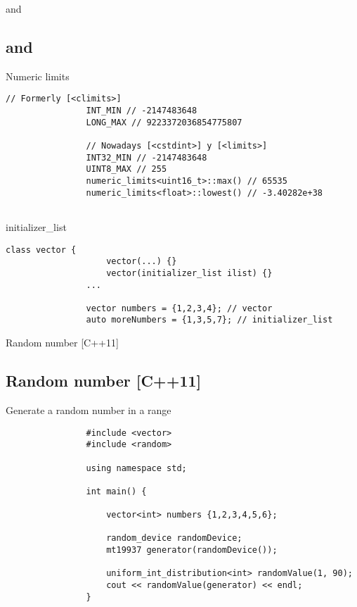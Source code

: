 \documentclass{beamer}
\newcommand{\normalSizeItem}[1] {
  \normalsize{\item #1}
}
\begin{document}
		\begin{frame}[fragile]{ and }	
			\subsection{ and }		
			\begin{itemize}
			
				\normalSizeItem { Numeric limits }
				\begin{lstlisting}[basicstyle={\tiny\ttfamily}]
				// Formerly [<climits>]
				INT_MIN // -2147483648
				LONG_MAX // 9223372036854775807
				
				// Nowadays [<cstdint>] y [<limits>]
				INT32_MIN // -2147483648
				UINT8_MAX // 255
				numeric_limits<uint16_t>::max() // 65535
				numeric_limits<float>::lowest() // -3.40282e+38
				
				\end{lstlisting}
				
				\normalSizeItem { initializer\_list }
				\begin{lstlisting}[basicstyle={\tiny\ttfamily}]
				class vector {
					vector(...) {}
					vector(initializer_list ilist) {}
				...
				
				vector numbers = {1,2,3,4}; // vector
				auto moreNumbers = {1,3,5,7}; // initializer_list
				\end{lstlisting}
				
			\end{itemize}
		\end{frame}
		
		\begin{frame}[fragile]{Random number [C++11]}	
			\subsection{Random number [C++11]}
			\begin{itemize}
			
				\normalSizeItem { Generate a random number in a range }
				\begin{lstlisting}
				#include <vector>
				#include <random>
				
				using namespace std;
				
				int main() {	
					
					vector<int> numbers {1,2,3,4,5,6};
					
					random_device randomDevice;
					mt19937 generator(randomDevice());
					
					uniform_int_distribution<int> randomValue(1, 90);
					cout << randomValue(generator) << endl;
				}
				\end{lstlisting}				
			\end{itemize}
		\end{frame}
		
\end{document}
